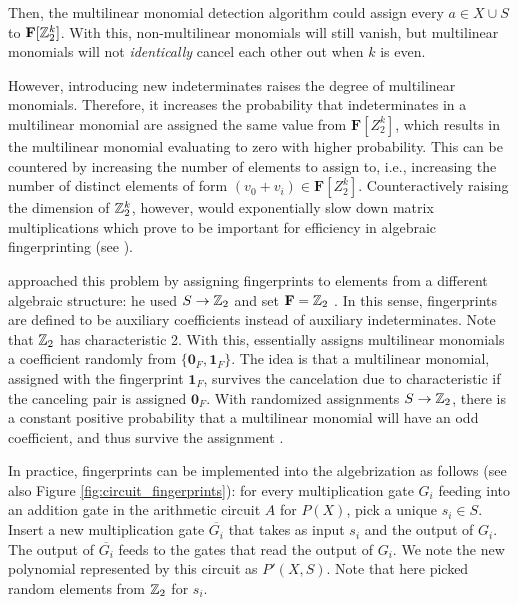 Then, the multilinear monomial detection algorithm 
could assign every $a \in X \cup S$ to $\mathbf{F}[\mathbb Z_2^k]$. 
With this, non-multilinear monomials will still vanish, but multilinear monomials 
will not \emph{identically} cancel each other out when $k$ is even. 

However, introducing new indeterminates raises the degree of multilinear
monomials. 
Therefore, it increases the probability that indeterminates in a multilinear monomial are 
assigned the same value from $\mathbf{F}[Z_2^k]$, which results in the 
multilinear monomial evaluating to zero with higher probability. 
This can be countered by increasing the number of elements to assign to, i.e., 
increasing the number of distinct elements of form $(v_0 + v_i) \in \mathbf{F}[Z_2^k]$. 
Counteractively raising the dimension of $\mathbb Z_2^k$, however, would 
exponentially slow down matrix multiplications which prove to be %
important for efficiency in algebraic fingerprinting (see ).

\citeauthor{Koutis08} approached this problem by assigning fingerprints to elements 
from a different algebraic structure: he used $S \to \mathbb Z_2$ and set 
$\mathbf{F} = \mathbb Z_2$ \cite{Koutis08}. In this sense, 
fingerprints are defined to be auxiliary coefficients instead of auxiliary indeterminates. 
Note that $\mathbb Z_2$ has characteristic 2. With this, 
\citeauthor{Koutis08} essentially assigns multilinear monomials a coefficient 
randomly from $\{\mathbf{0}_F, \mathbf{1}_F\}$. The idea is that a multilinear monomial, 
assigned with the fingerprint $\mathbf{1}_F$,  
survives the cancelation due to characteristic if the canceling pair is assigned $\mathbf{0}_F$. 
With randomized assignments $S \to \mathbb Z_2$, 
there is a constant positive probability that a multilinear 
monomial will have an odd coefficient, and thus survive the assignment \cite{Koutis08}.

In practice, fingerprints can be implemented 
into the algebrization as follows (see also Figure \ref{fig:circuit_fingerprints}): 
for every multiplication gate $G_i$ feeding into an addition gate 
in the arithmetic circuit $A$ for $P(X)$, 
pick a unique $s_i \in S$. Insert a new multiplication gate $\overbar{G_i}$ that takes 
as input $s_i$ and the output of $G_i$. The output of $\overbar{G_i}$ feeds to the 
gates that read the output of $G_i$. We note the new polynomial represented by this circuit 
as $P'(X, S)$. Note that here 
\citeauthor{Koutis08} picked random elements from $\mathbb Z_2$ for $s_i$.

